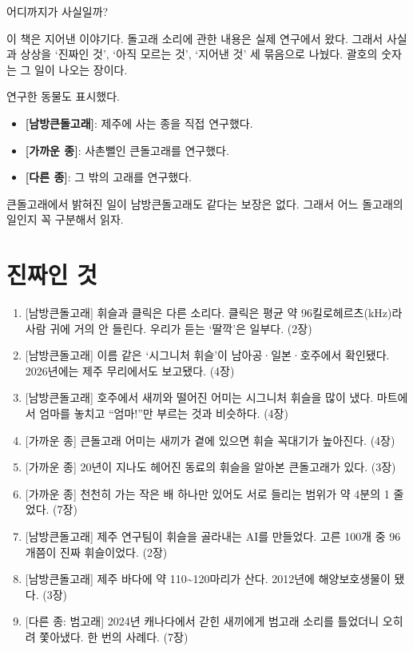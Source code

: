 \documentclass[
  korean,
  letterpaper,
  twoside,
  open=any,
  fontsize=12.5pt,
  headings=small]{scrbook}
\providecommand{\tightlist}{%
  \setlength{\itemsep}{0pt}\setlength{\parskip}{0pt}}
\begin{document}
어디까지가 사실일까?

이 책은 지어낸 이야기다.
돌고래 소리에 관한 내용은 실제
연구에서 왔다. 그래서 사실과
상상을 `진짜인 것', `아직
모르는 것', `지어낸 것' 세
묶음으로 나눴다. 괄호의 숫자는
그 일이 나오는 장이다.

연구한 동물도 표시했다.

\begin{itemize}
\tightlist
\item
  \textbf{{[}남방큰돌고래{]}}:
  제주에 사는 종을 직접
  연구했다.
\item
  \textbf{{[}가까운 종{]}}:
  사촌뻘인 큰돌고래를
  연구했다.
\item
  \textbf{{[}다른 종{]}}: 그
  밖의 고래를 연구했다.
\end{itemize}

큰돌고래에서 밝혀진 일이
남방큰돌고래도 같다는 보장은
없다. 그래서 어느 돌고래의
일인지 꼭 구분해서 읽자.

\section*{진짜인
것}\label{uxc9c4uxc9dcuxc778-uxac83}


\begin{enumerate}
\def\labelenumi{\arabic{enumi}.}
\tightlist
\item
  {[}남방큰돌고래{]} 휘슬과
  클릭은 다른 소리다. 클릭은
  평균 약 96킬로헤르츠(kHz)라
  사람 귀에 거의 안 들린다.
  우리가 듣는 `딸깍'은 일부다.
  (2장)
\item
  {[}남방큰돌고래{]} 이름 같은
  `시그니처 휘슬'이
  남아공·일본·호주에서
  확인됐다. 2026년에는 제주
  무리에서도 보고됐다. (4장)
\item
  {[}남방큰돌고래{]} 호주에서
  새끼와 떨어진 어미는
  시그니처 휘슬을 많이 냈다.
  마트에서 엄마를 놓치고
  ``엄마!''만 부르는 것과
  비슷하다. (4장)
\item
  {[}가까운 종{]} 큰돌고래
  어미는 새끼가 곁에 있으면
  휘슬 꼭대기가 높아진다.
  (4장)
\item
  {[}가까운 종{]} 20년이
  지나도 헤어진 동료의 휘슬을
  알아본 큰돌고래가 있다.
  (3장)
\item
  {[}가까운 종{]} 천천히 가는
  작은 배 하나만 있어도 서로
  들리는 범위가 약 4분의 1
  줄었다. (7장)
\item
  {[}남방큰돌고래{]} 제주
  연구팀이 휘슬을 골라내는
  AI를 만들었다. 고른 100개 중
  96개쯤이 진짜 휘슬이었다.
  (2장)
\item
  {[}남방큰돌고래{]} 제주
  바다에 약
  110\textasciitilde120마리가
  산다. 2012년에
  해양보호생물이 됐다. (3장)
\item
  {[}다른 종: 범고래{]} 2024년
  캐나다에서 갇힌 새끼에게
  범고래 소리를 틀었더니
  오히려 쫓아냈다. 한 번의
  사례다. (7장)
\end{enumerate}
\end{document}
